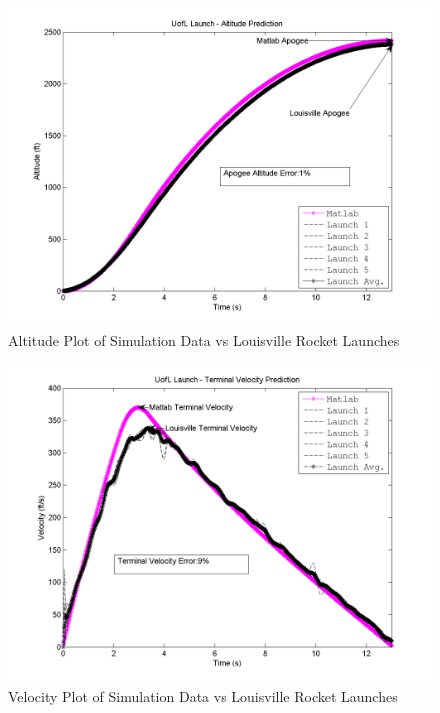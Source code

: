 \documentclass[]{article}
\begin{document}
\begin{figure}[htbp]
\centering
\includegraphics{images/plots/plot_louisville_altitude_analysis.png}
\caption{Altitude Plot of Simulation Data vs Louisville Rocket Launches
\label{experimental_comparison_altitude_label}}
\end{figure}

\begin{figure}[htbp]
\centering
\includegraphics{images/plots/plot_louisville_velocity_analysis.png}
\caption{Velocity Plot of Simulation Data vs Louisville Rocket Launches
\label{experimental_comparison_velocity_label}}
\end{figure}

\clearpage 
\end{document}

